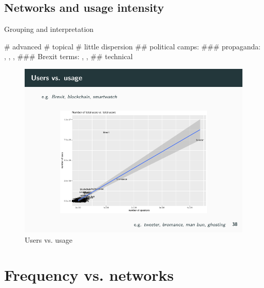 \documentclass[
  a4paper,
  ]{scrartcl}
\begin{document}
  \subsection{Networks and usage intensity}

    Grouping and interpretation

      \begin{easylist}[itemize]
        # advanced
        # topical
        # little dispersion
          ## political camps:
            ### propaganda: , , , 
            ### Brexit terms: , , 
          ## technical
      \end{easylist}

      \begin{figure}[H]
        \centering
        \includegraphics[width=\linewidth, height=.8\textheight, keepaspectratio]{images/users-vs-usage.pdf}
        \caption{Users vs. usage}
      \end{figure}

\section{Frequency vs. networks}


  \printbibliography
\end{document}
